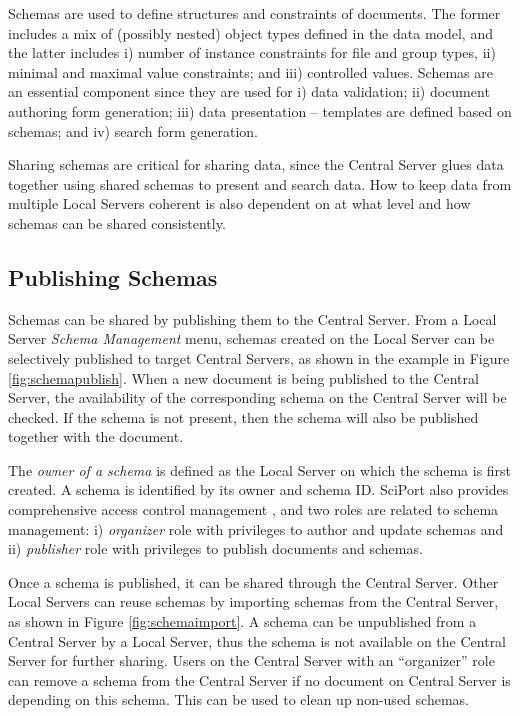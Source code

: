 \documentclass{doublecol-new}
\theoremstyle{TH}{
\newtheorem{lemma}{Lemma}
\newtheorem{theorem}[lemma]{Theorem}
\newtheorem{corrolary}[lemma]{Corrolary}
\newtheorem{conjecture}[lemma]{Conjecture}
\newtheorem{proposition}[lemma]{Proposition}
\newtheorem{claim}[lemma]{Claim}
\newtheorem{stheorem}[lemma]{Wrong Theorem}
\newtheorem{algorithm}{Algorithm}
}
\theoremstyle{THrm}{
\newtheorem{definition}{Definition}[section]
\newtheorem{question}{Question}[section]
\newtheorem{remark}{Remark}
\newtheorem{scheme}{Scheme}
}
\theoremstyle{THhit}{
\newtheorem{case}{Case}[section]
}
\begin{document}
Schemas are used to define structures and constraints of documents.
The former includes a mix of (possibly nested) object types defined
in the data model, and the latter includes i) number of instance
constraints for file and group types, ii) minimal and maximal value
constraints; and iii) controlled values.  Schemas are an essential
component  since they are used for i) data validation; ii) document
authoring form generation; iii) data presentation -- templates are
defined based on schemas; and iv) search form generation.


Sharing schemas are critical for sharing data, since the Central
Server glues data together using shared schemas to present and
search data. How to keep data from multiple Local Servers coherent
is also dependent on at what level and how schemas can be shared
consistently.


\subsection{Publishing Schemas}

Schemas can be shared by publishing them to the Central Server. From
a  Local Server {\em Schema Management} menu, schemas created on the
Local Server can be selectively published to target Central Servers,
as shown in the example in Figure \ref{fig:schemapublish}. When a
new document is being published to the Central Server, the
availability of the corresponding schema on the Central Server will
be checked. If the schema is not present, then the schema will also
be published together with the document.


The {\em owner of a schema} is defined as the Local Server on which
the schema is first created.  A schema is identified by its owner
and schema ID.  SciPort also provides comprehensive access control
management \cite{wang09security}, and two roles are related to
schema management: i) {\em organizer} role with privileges to author
and update schemas and ii) {\em publisher} role with  privileges to
publish documents and schemas.


Once a schema is published, it can be shared through the Central
Server. Other Local Servers can reuse schemas by importing schemas
from the Central Server, as shown in Figure \ref{fig:schemaimport}.
A schema can be unpublished from a Central Server by a Local Server,
thus the schema is not available on the Central Server for further
sharing.  Users on the Central Server with an ``organizer'' role can
remove a schema from the Central Server if no document on Central
Server is depending on this schema. This can be used to clean up
non-used schemas.
\end{document}
